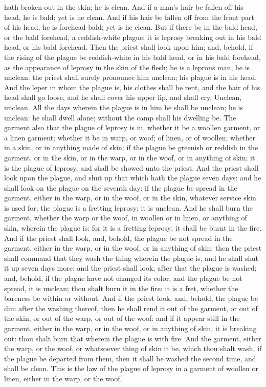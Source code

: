 hath broken out in the skin; he is clean.  And if a man’s hair be fallen off his head, he is bald; yet is he clean. And if his hair be fallen off from the front part of his head, he is forehead bald; yet is he clean. But if there be in the bald head, or the bald forehead, a reddish-white plague; it is leprosy breaking out in his bald head, or his bald forehead. Then the priest shall look upon him; and, behold, if the rising of the plague be reddish-white in his bald head, or in his bald forehead, as the appearance of leprosy in the skin of the flesh; he is a leprous man, he is unclean: the priest shall surely pronounce him unclean; his plague is in his head.  And the leper in whom the plague is, his clothes shall be rent, and the hair of his head shall go loose, and he shall cover his upper lip, and shall cry, Unclean, unclean. All the days wherein the plague is in him he shall be unclean; he is unclean: he shall dwell alone; without the camp shall his dwelling be.  The garment also that the plague of leprosy is in, whether it be a woollen garment, or a linen garment; whether it be in warp, or woof; of linen, or of woollen; whether in a skin, or in anything made of skin; if the plague be greenish or reddish in the garment, or in the skin, or in the warp, or in the woof, or in anything of skin; it is the plague of leprosy, and shall be showed unto the priest. And the priest shall look upon the plague, and shut up that which hath the plague seven days: and he shall look on the plague on the seventh day: if the plague be spread in the garment, either in the warp, or in the woof, or in the skin, whatever service skin is used for; the plague is a fretting leprosy; it is unclean. And he shall burn the garment, whether the warp or the woof, in woollen or in linen, or anything of skin, wherein the plague is: for it is a fretting leprosy; it shall be burnt in the fire.  And if the priest shall look, and, behold, the plague be not spread in the garment, either in the warp, or in the woof, or in anything of skin; then the priest shall command that they wash the thing wherein the plague is, and he shall shut it up seven days more: and the priest shall look, after that the plague is washed; and, behold, if the plague have not changed its color, and the plague be not spread, it is unclean; thou shalt burn it in the fire: it is a fret, whether the bareness be within or without.  And if the priest look, and, behold, the plague be dim after the washing thereof, then he shall rend it out of the garment, or out of the skin, or out of the warp, or out of the woof: and if it appear still in the garment, either in the warp, or in the woof, or in anything of skin, it is breaking out: thou shalt burn that wherein the plague is with fire. And the garment, either the warp, or the woof, or whatsoever thing of skin it be, which thou shalt wash, if the plague be departed from them, then it shall be washed the second time, and shall be clean.  This is the law of the plague of leprosy in a garment of woollen or linen, either in the warp, or the woof, 